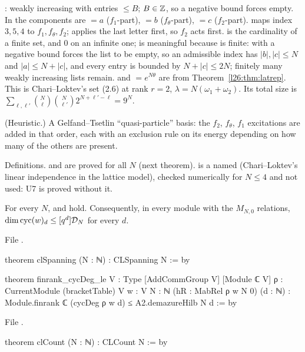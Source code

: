 \begin{dictionary}
:  weakly increasing with entries $\le B$; $B\in{\mathbb{Z}}$, so a negative bound forces  empty.
In  the components are $=a$ ($f_1$-part), $=b$ ($f_\theta$-part),
$=c$ ($f_2$-part).  maps index $3,5,4$ to $f_1,f_\theta,f_2$;  applies the last letter
first, so $f_2$ acts first.  is the cardinality of a finite set, and $0$ on an infinite one;  is meaningful
because  is finite:  with a negative bound forces the list to be empty, so an admissible index has
$|b|,|c|\le N$ and $|a|\le N+|c|$, and every entry is bounded by $N+|c|\le2N$; finitely many weakly increasing lists remain.
 and 
$=e^{N\theta}$ are from Theorem~\ref{l26:thm:latrep}. This is Chari--Loktev's set (2.6) at rank $r=2$,
$\lambda=N(\omega_1+\omega_2)$. Its total size is $\sum_{\ell,\ell'}\binom N\ell\binom N{\ell'}2^{N+\ell'-\ell}=9^N$.
\end{dictionary}

\begin{physics}
(Heuristic.) A Gelfand--Tsetlin ``quasi-particle'' basis: the $f_2$, $f_\theta$, $f_1$ excitations are added in that order, each with
an exclusion rule on its energy depending on how many of the others are present.
\end{physics}

\begin{status}
Definitions.  and  are proved for all $N$ (next theorem).  is a
named  (Chari--Loktev's linear independence in the lattice model), checked numerically for $N\le4$ and not used:
U7 is proved without it.
\end{status}

\begin{theorem}\label{l26:thm:cl}
For every $N$,  and  hold. Consequently, in every module with the $M_{N,0}$ relations,
$\dim\operatorname{cyc}(w)_d\le[q^d]\mathcal D_N$ for every $d$.
\end{theorem}
\noindent File .
\begin{leancode}
theorem clSpanning (N : ℕ) : CLSpanning N := by

theorem finrank_cycDeg_le {V : Type} [AddCommGroup V] [Module ℂ V] {ρ : CurrentModule (bracketTable) V}
    {w : V} {N : ℕ} (hR : MabRel ρ w N 0) (d : ℕ) :
    Module.finrank ℂ (cycDeg ρ w d) ≤ A2.demazureHilb N d := by
\end{leancode}
\noindent File .
\begin{leancode}
theorem clCount (N : ℕ) : CLCount N := by
\end{leancode}

